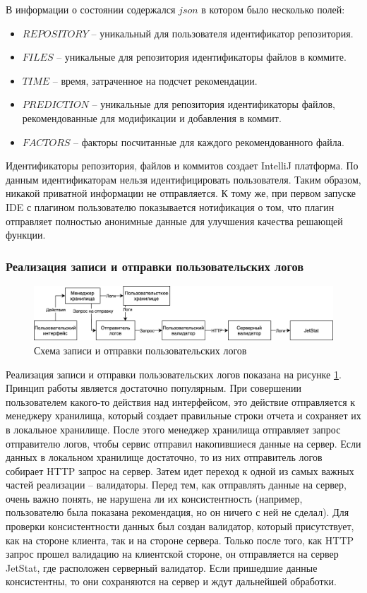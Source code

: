 \documentclass[times]{itmo-student-thesis}
\begin{document}
В информации о состоянии содержался $json$ в котором было несколько полей:
    \begin{itemize}[label={\textbullet}]
        \item $REPOSITORY$ -- уникальный для пользователя идентификатор репозитория.
        \item $FILES$ -- уникальные для репозитория идентификаторы файлов в коммите.
        \item $TIME$ -- время, затраченное на подсчет рекомендации.
        \item $PREDICTION$ -- уникальные для репозитория идентификаторы файлов, рекомендованные для модификации и добавления в коммит.
        \item $FACTORS$ -- факторы посчитанные для каждого рекомендованного файла.
    \end{itemize}
Идентификаторы репозитория, файлов и коммитов создает IntelliJ платформа. По данным идентификаторам нельзя идентифицировать пользователя. Таким образом, никакой приватной информации не отправляется. К тому же, при первом запуске IDE с плагином пользователю показывается нотификация о том, что плагин отправляет полностью анонимные данные для улучшения качества решающей функции.
\subsubsection{Реализация записи и отправки пользовательских логов}
\begin{figure}[!h]
\caption{Схема записи и отправки пользовательских логов}\label{jet-stat-logs}
\centering
\includegraphics[scale=0.2]{JetStat.png}
\end{figure}
Реализация записи и отправки пользовательских логов показана на рисунке \ref{jet-stat-logs}. Принцип работы является достаточно популярным. При совершении пользователем какого-то действия над интерфейсом, это действие отправляется к менеджеру хранилища, который создает правильные строки отчета и сохраняет их в локальное хранилище. После этого менеджер хранилища отправляет запрос отправителю логов, чтобы сервис отправил накопившиеся данные на сервер. Если данных в локальном хранилище достаточно, то из них отправитель логов собирает HTTP запрос на сервер. Затем идет переход к одной из самых важных частей реализации -- валидаторы. Перед тем, как отправлять данные на сервер, очень важно понять, не нарушена ли их консистентность (например, пользователю была показана рекомендация, но он ничего с ней не сделал). Для проверки консистентности данных был создан валидатор, который присутствует, как на стороне клиента, так и на стороне сервера. Только после того, как HTTP запрос прошел валидацию на клиентской стороне, он отправляется на сервер JetStat, где расположен серверный валидатор. Если пришедшие данные консистентны, то они сохраняются на сервер и ждут дальнейшей обработки.
\end{document}
